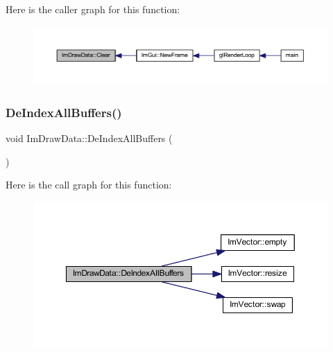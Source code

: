 Here is the caller graph for this function\+:
\nopagebreak
\begin{figure}[H]
\begin{center}
\leavevmode
\includegraphics[width=350pt]{struct_im_draw_data_ab6a90612bd22eaff0d42539875e2e5c9_icgraph}
\end{center}
\end{figure}
\mbox{\label{struct_im_draw_data_a88ae746e958b79ee527fe94dee29d57c}} 
\subsubsection{\texorpdfstring{De\+Index\+All\+Buffers()}{DeIndexAllBuffers()}}
{\footnotesize\ttfamily void Im\+Draw\+Data\+::\+De\+Index\+All\+Buffers (\begin{DoxyParamCaption}{ }\end{DoxyParamCaption})}

Here is the call graph for this function\+:
\nopagebreak
\begin{figure}[H]
\begin{center}
\leavevmode
\includegraphics[width=350pt]{struct_im_draw_data_a88ae746e958b79ee527fe94dee29d57c_cgraph}
\end{center}
\end{figure}
\mbox{\label{struct_im_draw_data_abbfb7f8351b436da654f93b6f103f0e2}} 
